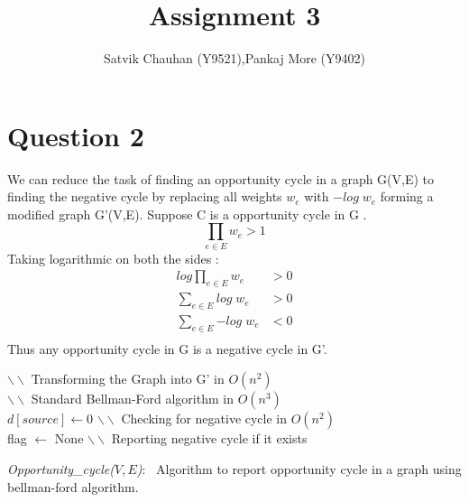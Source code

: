 \documentclass[11pt]{article}
\title{Assignment 3}
\author{Satvik Chauhan (Y9521),Pankaj More (Y9402)}
\begin{document}
\maketitle
\section*{Question 2}
We can reduce the task of finding an opportunity cycle in a graph G(V,E) to finding the negative cycle by replacing all weights $w_e$ with $-log \; w_e$
forming a modified graph G'(V,E). Suppose C is a opportunity cycle in G . 
\[ \prod_{e \in E} {w_e} > 1 \]
Taking logarithmic on both the sides :
\begin{align*}
log \prod_{e \in E} {w_e} &> 0 \\
\sum_{e \in E} {log \; w_e} &> 0 \\
\sum_{e \in E} {-log \; w_e} &< 0 \\
\end{align*}
Thus any opportunity cycle in G is a negative cycle in G'. 

\linesnumbered
\begin{algorithm}[h]
$\backslash \backslash$ Transforming the Graph into G' in $O(n^2)$ \\
$\backslash \backslash$ Standard Bellman-Ford algorithm  in $O(n^3)$ \\
$d[source]\leftarrow 0$\;
$\backslash \backslash$ Checking for negative cycle in $O(n^2)$ \\
flag $\leftarrow$ None \;
$\backslash \backslash$ Reporting negative cycle if it exists \\
\caption{{\em Opportunity\_cycle($V,E$)}:~
Algorithm to report opportunity cycle in a graph using bellman-ford algorithm.
}
\label{Bellman-final}
\end{algorithm}
\end{document}
